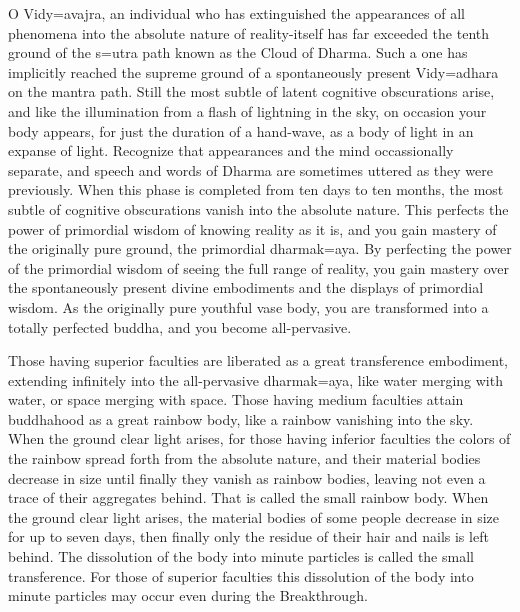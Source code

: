 \documentclass[11pt,twocolumn]{article}
\begin{document}
O Vidy\a={a}vajra, an individual who has extinguished the appearances
of all phenomena into the absolute nature of reality\hyp{}itself has
far exceeded the tenth ground of the s\a={u}tra path known as the
Cloud of Dharma. Such a one has implicitly reached the supreme ground
of a spontaneously present Vidy\a={a}dhara on the mantra path. Still
the most subtle of latent cognitive obscurations arise, and like the
illumination from a flash of lightning in the sky, on occasion your
body appears, for just the duration of a hand\hyp{}wave, as a body of
light in an expanse of light. Recognize that appearances and the mind
occassionally separate, and speech and words of Dharma are sometimes
uttered as they were previously. When this phase is completed from ten
days to ten months, the most subtle of cognitive obscurations vanish
into the absolute nature. This perfects the power of primordial wisdom
of knowing reality as it is, and you gain mastery of the originally
pure ground, the primordial dharmak\a={a}ya. By perfecting the power
of the primordial wisdom of seeing the full range of reality, you gain
mastery over the spontaneously present divine embodiments and the
displays of primordial wisdom. As the originally pure youthful vase
body, you are transformed into a totally perfected buddha, and you
become all\hyp{}pervasive.

Those having superior faculties are liberated as a great transference
embodiment, extending infinitely into the all\hyp{}pervasive
dharmak\a={a}ya, like water merging with water, or space merging with
space. Those having medium faculties attain buddhahood as a great
rainbow body, like a rainbow vanishing into the sky. When the ground
clear light arises, for those having inferior faculties the colors of
the rainbow spread forth from the absolute nature, and their material
bodies decrease in size until finally they vanish as rainbow bodies,
leaving not even a trace of their aggregates behind. That is called
the small rainbow body. When the ground clear light arises, the
material bodies of some people decrease in size for up to seven days,
then finally only the residue of their hair and nails is left
behind. The dissolution of the body into minute particles is called
the small transference. For those of superior faculties this
dissolution of the body into minute particles may occur even during
the Breakthrough.
\end{document}
